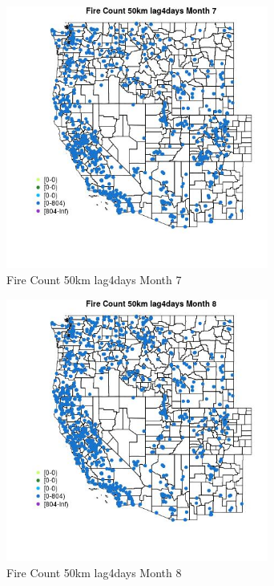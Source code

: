 \begin{figure} 
\centering  
\includegraphics[width=0.77\textwidth]{Code_Outputs/Report_ML_input_PM25_Step4_part_f_de_duplicated_aveswNAs_MapObsMo7Fire_Count_50km_lag4days.jpg} 
\caption{\label{fig:Report_ML_input_PM25_Step4_part_f_de_duplicated_aveswNAsMapObsMo7Fire_Count_50km_lag4days}Fire Count 50km lag4days Month 7} 
\end{figure} 
 

\begin{figure} 
\centering  
\includegraphics[width=0.77\textwidth]{Code_Outputs/Report_ML_input_PM25_Step4_part_f_de_duplicated_aveswNAs_MapObsMo8Fire_Count_50km_lag4days.jpg} 
\caption{\label{fig:Report_ML_input_PM25_Step4_part_f_de_duplicated_aveswNAsMapObsMo8Fire_Count_50km_lag4days}Fire Count 50km lag4days Month 8} 
\end{figure} 
 

